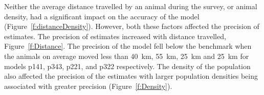 \documentclass[a4paper,10pt,reqno,oneside]{amsart}
\begin{document}
Neither the average distance travelled by an animal during the survey, or animal density, had a significant impact on the accuracy of the model (Figure~\ref{f:distanceDensity}). However, both these factors affected the precision of estimates. The precision of estimates increased with distance travelled, Figure~\ref{f:Distance}. The precision of the model fell below the benchmark when the animals on average moved less than \SI{40}{\kilo\meter}, \SI{55}{\kilo\meter}, \SI{25}{\kilo\meter} and \SI{25}{\kilo\meter} for models p141, p343, p221, and p322 respectively. The density of the population also affected the precision of the estimates with larger population densities being associated with greater precision (Figure~\ref{f:Density}). 
\end{document}
